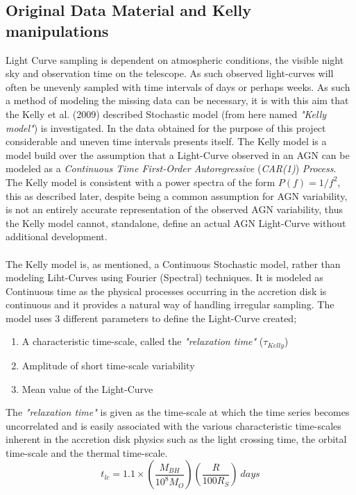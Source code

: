 \documentclass[a4paper, 12pt, twoside]{article}
\begin{document}
\subsection{Original Data Material and Kelly manipulations} \label{Kelly}
Light Curve sampling is dependent on atmospheric conditions, the visible night sky and observation time on the telescope. As such observed light-curves will often be unevenly sampled with time intervals of days or perhaps weeks. As such a method of modeling the missing data can be necessary, it is with this aim that the Kelly et al. (2009) described Stochastic model (from here named \emph{"Kelly model"}) is investigated. In the data obtained for the purpose of this project considerable and uneven time intervals presents itself. The Kelly model is a model build over the assumption that a Light-Curve observed in an AGN can be modeled as a \emph{Continuous Time First-Order Autoregressive} (\emph{CAR(1)}) \emph{Process}. The Kelly model is consistent with a power spectra of the form $P(f)=1/f^{2}$, this as described later, despite being a common assumption for AGN variability, is not an entirely accurate representation of the observed AGN variability, thus the Kelly model cannot, standalone, define an actual AGN Light-Curve without additional development. \\
\\
The Kelly model is, as mentioned, a Continuous Stochastic model, rather than modeling Liht-Curves using Fourier (Spectral) techniques. It is modeled as Continuous time as the physical processes occurring in the accretion disk is continuous and it provides a natural way of handling irregular sampling. The model uses 3 different parameters to define the Light-Curve created;
\begin{enumerate}
\item A characteristic time-scale, called the \emph{"relaxation time"} ($\tau_{Kelly}$)
\item Amplitude of short time-scale variability
\item Mean value of the Light-Curve
\end{enumerate}
The \emph{"relaxation time"} is given as the time-scale at which the time series becomes uncorrelated and is easily associated with the various characteristic time-scales inherent in the accretion disk physics such as the light crossing time, the orbital time-scale and the thermal time-scale.
\begin{equation}
t_{lc} = 1.1\times(\frac{M_{BH}}{10^{8}M_{O}})(\frac{R}{100R_{S}})~days
\label{eq:t_lc}
\end{equation} 
\end{document}

